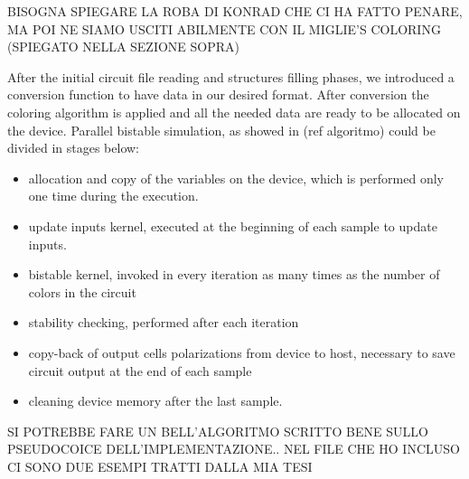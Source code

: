 BISOGNA SPIEGARE LA ROBA DI KONRAD CHE CI HA FATTO PENARE, MA POI NE SIAMO USCITI ABILMENTE CON IL MIGLIE'S COLORING (SPIEGATO NELLA SEZIONE SOPRA)

After the initial circuit file reading and structures filling phases, we introduced a conversion function to have data in our desired format.
After conversion the coloring algorithm is applied and all the needed data are ready to be allocated on the device.\newline
Parallel bistable simulation, as showed in (ref algoritmo) could be divided in stages below:
\begin{itemize}
 \item allocation and copy of the variables on the device, which is performed only one time during the execution.
 \item update inputs kernel, executed at the beginning of each sample to update inputs.
 \item bistable kernel, invoked in every iteration as many times as the number of colors in the circuit
 \item stability checking, performed after each iteration
 \item copy-back of output cells polarizations from device to host, necessary to save circuit output at the end of each sample
 \item cleaning device memory after the last sample.
\end{itemize}


SI POTREBBE FARE UN BELL'ALGORITMO SCRITTO BENE SULLO PSEUDOCOICE DELL'IMPLEMENTAZIONE.. NEL FILE CHE HO INCLUSO CI SONO DUE ESEMPI
TRATTI DALLA MIA TESI






